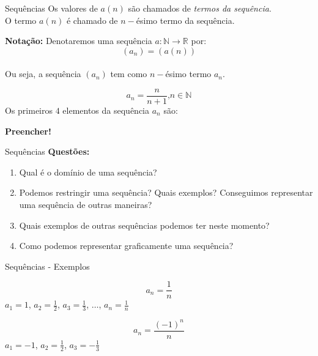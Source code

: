 \documentclass[hyperref={pdfpagelabels=false}]{beamer}
\begin{document}
\begin{frame}{Sequências}
 Os valores de $a(n)$ são chamados de \emph{termos da sequência}. \\
 O termo $a(n)$ é chamado de $n-$ésimo termo da sequência. \\ \pause
 
 {\bf Notação:} Denotaremos uma sequência $a: \mathbb{N} \rightarrow \mathbb{R}$ por: $$(a_n) = (a(n))$$ \\
 
 Ou seja, a sequência $(a_n)$ tem como $n-$ésimo termo $a_n$. \pause
 
 \begin{example}
  \begin{equation*}
   a_n = \frac{n}{n+1}\text{,} n \in \mathbb{N} 
  \end{equation*} \pause
  Os primeiros $4$ elementos da sequência $a_n$ são: \pause
  
  {\bf Preencher!}
 \end{example}

\end{frame}

\begin{frame}{Sequências}
 {\bf Questões:} \pause
 \begin{enumerate}
  \item Qual é o domínio de uma sequência? \pause
  \item Podemos restringir uma sequência? \pause Quais exemplos? \pause Conseguimos representar uma sequência de outras maneiras? \pause
  \item Quais exemplos de outras sequências podemos ter neste momento? \pause
  \item Como podemos representar graficamente uma sequência?
 \end{enumerate}

\end{frame}

\begin{frame}{Sequências - Exemplos}
 \begin{example}
  \begin{equation*}
   a_n = \frac{1}{n}
  \end{equation*} \pause
  $a_1 = 1$, \pause$a_2 = \displaystyle \frac{1}{2}$, \pause$a_3 = \displaystyle \frac{1}{3}$, \pause$\dots$, \pause$a_n = \displaystyle \frac{1}{n}$
 \end{example}
 
   \begin{example}
  \begin{equation*}
   a_n = \frac{(-1)^n}{n}
  \end{equation*} \pause
  $a_1 = -1$, \pause $a_2 = \displaystyle \frac{1}{2}$, \pause $a_3 = -\displaystyle \frac{1}{3}$
  
 \end{example}
 
\end{frame}
\end{document}
